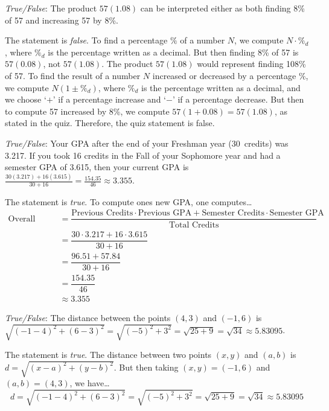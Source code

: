 \documentclass[11pt,letterpaper]{article}
\begin{document}
\thispagestyle{title}

\quizsol \textit{True/False}: The product $57(1.08)$ can be interpreted either as both finding 8\% of 57 and increasing 57 by 8\%. \pspace

\sol The statement is \textit{false}. To find a percentage $\%$ of a number $N$, we compute $N \cdot \%_d$, where $\%_d$ is the percentage written as a decimal. But then finding 8\% of 57 is $57(0.08)$, not $57(1.08)$. The product $57(1.08)$ would represent finding 108\% of 57. To find the result of a number $N$ increased or decreased by a percentage $\%$, we compute $N(1 \pm \%_d)$, where $\%_d$ is the percentage written as a decimal, and we choose `$+$' if a percentage increase and `$-$' if a percentage decrease. But then to compute 57 increased by 8\%, we compute $57(1 + 0.08)= 57(1.08)$, as stated in the quiz. Therefore, the quiz statement is false. \pvspace{1.3cm}



\quizsol \textit{True/False}: Your GPA after the end of your Freshman year (30~credits) was 3.217. If you took 16 credits in the Fall of your Sophomore year and had a semester GPA of 3.615, then your current GPA is $\frac{30(3.217) + 16(3.615)}{30+16}= \frac{154.35}{46} \approx 3.355$. \pspace

\sol The statement is \textit{true}. To compute ones new GPA, one computes\dots
	\[
	\begin{aligned}
	\text{Overall GPA}&= \dfrac{\text{Previous Credits} \cdot \text{Previous GPA} + \text{Semester Credits} \cdot \text{Semester GPA}}{\text{Total Credits}} \\
	&= \dfrac{30 \cdot 3.217 + 16 \cdot 3.615}{30 + 16} \\
	&= \dfrac{96.51 + 57.84}{30 + 16} \\
	&= \dfrac{154.35}{46} \\
	&\approx 3.355
	\end{aligned}
	\] \pvspace{1cm}



\quizsol \textit{True/False}: The distance between the points $(4, 3)$ and $(-1, 6)$ is $\sqrt{(-1 - 4)^2 + (6 - 3)^2}= \sqrt{(-5)^2 + 3^2}= \sqrt{25 + 9}= \sqrt{34} \approx 5.83095$. \pspace

\sol The statement is \textit{true}. The distance between two points $(x, y)$ and $(a, b)$ is $d= \sqrt{(x - a)^2 + (y - b)^2}$. But then taking $(x, y)= (-1, 6)$ and $(a, b)= (4, 3)$, we have\dots
	\[
	d= \sqrt{(-1 - 4)^2 + (6 - 3)^2}= \sqrt{(-5)^2 + 3^2}= \sqrt{25 + 9}= \sqrt{34} \approx 5.83095
	\] \pvspace{1.3cm}
\end{document}
